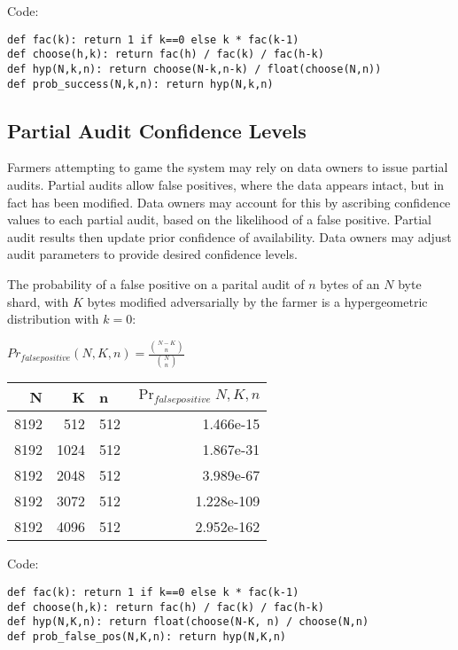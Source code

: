 \documentclass[a4paper,10pt]{article}
\begin{document}
Code:
\begin{lstlisting}
def fac(k): return 1 if k==0 else k * fac(k-1)
def choose(h,k): return fac(h) / fac(k) / fac(h-k)
def hyp(N,k,n): return choose(N-k,n-k) / float(choose(N,n))
def prob_success(N,k,n): return hyp(N,k,n)
\end{lstlisting}

\subsection{Partial Audit Confidence Levels}
Farmers attempting to game the system may rely on data owners to issue partial
audits. Partial audits allow false positives, where the data appears intact, but
in fact has been modified. Data owners may account for this by ascribing
confidence values to each partial audit, based on the likelihood of a false
positive. Partial audit results then update prior confidence of availability.
Data owners may adjust audit parameters to provide desired confidence levels.

The probability of a false positive on a parital audit of $ n $ bytes of an $ N
$ byte shard, with $ K $ bytes modified adversarially by the farmer is a
hypergeometric distribution with $ k = 0 $:

{\centering
$Pr_{false positive}(N,K,n) = \displaystyle \frac{{N-K \choose n}} {{N \choose
n}}$
\\}

\begin{table}[hbt!]
\begin{center}
\begin{tabular}{r r l r}
N & K & n & $\Pr_{falsepositive}{N,K,n}$\\
\hline 8192 & 512  & 512 & 1.466e-15\\
\hline 8192 & 1024 & 512 & 1.867e-31\\
\hline 8192 & 2048 & 512 & 3.989e-67\\
\hline 8192 & 3072 & 512 & 1.228e-109\\
\hline 8192 & 4096 & 512 & 2.952e-162\\
\end{tabular}
\end{center}
\end{table}

Code:
\begin{lstlisting}
def fac(k): return 1 if k==0 else k * fac(k-1)
def choose(h,k): return fac(h) / fac(k) / fac(h-k)
def hyp(N,K,n): return float(choose(N-K, n) / choose(N,n)
def prob_false_pos(N,K,n): return hyp(N,K,n)
\end{lstlisting}
\end{document}
